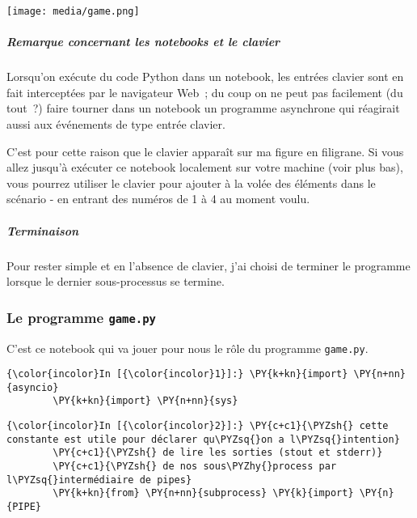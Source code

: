     \texttt{[image: media/game.png]}

    \hypertarget{remarque-concernant-les-notebooks-et-le-clavier}{%
\subparagraph{Remarque concernant les notebooks et le
clavier}\label{remarque-concernant-les-notebooks-et-le-clavier}}

    Lorsqu'on exécute du code Python dans un notebook, les entrées clavier
sont en fait interceptées par le navigateur Web~; du coup on ne peut pas
facilement (du tout~?) faire tourner dans un notebook un programme
asynchrone qui réagirait aussi aux événements de type entrée clavier.

C'est pour cette raison que le clavier apparaît sur ma figure en
filigrane. Si vous allez jusqu'à exécuter ce notebook localement sur
votre machine (voir plus bas), vous pourrez utiliser le clavier pour
ajouter à la volée des éléments dans le scénario - en entrant des
numéros de 1 à 4 au moment voulu.

    \hypertarget{terminaison}{%
\subparagraph{Terminaison}\label{terminaison}}

    Pour rester simple et en l'absence de clavier, j'ai choisi de terminer
le programme lorsque le dernier sous-processus se termine.

    \hypertarget{le-programme-game.py}{%
\subsubsection{\texorpdfstring{Le programme
\texttt{game.py}}{Le programme game.py}}\label{le-programme-game.py}}

    C'est ce notebook qui va jouer pour nous le rôle du programme
\texttt{game.py}.

    \begin{Verbatim}[commandchars=\\\{\},frame=single,framerule=0.3mm,rulecolor=\color{cellframecolor}]
{\color{incolor}In [{\color{incolor}1}]:} \PY{k+kn}{import} \PY{n+nn}{asyncio}
        \PY{k+kn}{import} \PY{n+nn}{sys}
\end{Verbatim}


    \begin{Verbatim}[commandchars=\\\{\},frame=single,framerule=0.3mm,rulecolor=\color{cellframecolor}]
{\color{incolor}In [{\color{incolor}2}]:} \PY{c+c1}{\PYZsh{} cette constante est utile pour déclarer qu\PYZsq{}on a l\PYZsq{}intention}
        \PY{c+c1}{\PYZsh{} de lire les sorties (stout et stderr)}
        \PY{c+c1}{\PYZsh{} de nos sous\PYZhy{}process par l\PYZsq{}intermédiaire de pipes}
        \PY{k+kn}{from} \PY{n+nn}{subprocess} \PY{k}{import} \PY{n}{PIPE}
\end{Verbatim}


